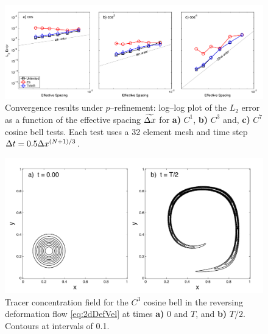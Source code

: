 \documentclass{ametsoc}
\begin{document}
\begin{figure}[t]
\includegraphics[width=\textwidth]{figs/1d/cosbellConvg_nodal.pdf}
\caption{Convergence results under $p$--refinement: log--log plot of the $L_2$ error as a function of the effective spacing $\widetilde{\Delta x}$ for {\bf a)} $C^1$, {\bf b)} $C^3$ and, {\bf c)} $C^7$ cosine bell tests. Each test uses a 32 element mesh and time step $\Delta t = 0.5 \Delta x^{(N+1)/3}$.} \label{fig:cosConv-p}
\end{figure}

\begin{figure}[t]
\includegraphics[width= 0.8 \textwidth]{figs/2d/defCosbellExact.pdf}
\caption{Tracer concentration field for the $C^3$ cosine bell in the reversing deformation flow \eqref{eq:2dDefVel} at times \textbf{a)} 0 and $T$, and  \textbf{b)} $T/2$. Contours at intervals of 0.1.}
\label{fig:cosbellExact}
\end{figure}
\end{document}
